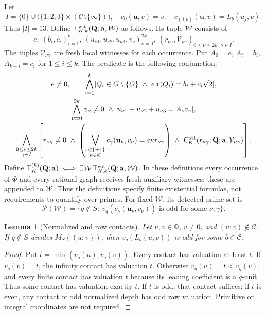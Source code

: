 \documentclass[11pt]{article}
\newtheorem{lemma}[theorem]{Lemma}
\theoremstyle{definition}\newtheorem{inputthm}[theorem]{Hypothesis}
\theoremstyle{remark}\newtheorem{remark}[theorem]{Remark}
\newcommand{\Q}{\mathbb Q}\newcommand{\Z}{\mathbb Z}
\newcommand{\C}{\mathcal C}\newcommand{\Supp}{\operatorname{Supp}}
\begin{document}
Let
\[
 I=\{0\}\cup\bigl(\{1,2,3\}\times(\C\setminus\{\infty\})\bigr),
 \quad
 c_0(\mathbf u,v)=v,
 \quad c_{(j,b)}(\mathbf u,v)=L_b(u_j,v).
\]
Thus $|I|=13$. Define $\mathsf T_{K,k}^{\rm wit}(\mathbf Q;\mathbf a,\mathcal W)$
as follows. Its tuple $\mathcal W$ consists of
\[
 e,\ (b_i,c_i)_{i=1}^k,
 \ (u_{\nu1},u_{\nu2},u_{\nu3},v_\nu)_{\nu=0}^{2k},
 \ (r_{\nu\gamma},\mathcal V_{\nu\gamma})_{
          0\le\nu\le2k,\ \gamma\in I}.
\]
The tuples $\mathcal V_{\nu\gamma}$ are fresh local witnesses for
each occurrence. Put $A_0=e$, $A_i=b_i$, $A_{k+i}=c_i$ for
$1\le i\le k$. The predicate is the following conjunction:
\begin{equation}\label{dir:T-wit}
\begin{gathered}
 e\ne0,\qquad
 \bigwedge_{i=1}^k[Q_i\in G\setminus\{O\}\ \land\
             e\,x(Q_i)=b_i+c_i\sqrt2],\\
 \bigwedge_{\nu=0}^{2k}
 [v_\nu\ne0\ \land\ u_{\nu1}+u_{\nu2}+u_{\nu3}=A_\nu v_\nu],\\
 \bigwedge_{\substack{0\le\nu\le2k\\\gamma\in I}}
 \left[
 r_{\nu\gamma}\ne0\ \land\
 \left(\bigvee_{\substack{\varepsilon\in\{\pm1\}\\\kappa\in\mathcal K}}
       c_\gamma(\mathbf u_\nu,v_\nu)=\varepsilon\kappa r_{\nu\gamma}
 \right)\ \land\
 \mathsf C_K^{\rm wit}(r_{\nu\gamma};\mathbf Q;\mathbf a,
                         \mathcal V_{\nu\gamma})
 \right].
\end{gathered}
\end{equation}
Define $\mathsf T_K^{(k)}(\mathbf Q;\mathbf a)\iff
\exists\mathcal W\,\mathsf T_{K,k}^{\rm wit}(\mathbf Q;\mathbf a,\mathcal W)$.
In these definitions every occurrence of $\Phi$ and every rational
graph receives fresh auxiliary witnesses; these are appended to
$\mathcal W$. Thus the definitions specify finite existential
formulas, not requirements to quantify over primes. For fixed
$\mathcal W$, its detected prime set is
\[
 \mathcal P(\mathcal W)=
 \{q\notin S:\ v_q(c_\gamma(\mathbf u_\nu,v_\nu))
                 \text{ is odd for some }\nu,\gamma\}.
\]

\begin{lemma}[Normalized and raw contacts]\label{dir:raw-contact}
Let $u,v\in\Q$, $v\ne0$, and $(u:v)\notin\C$.
If $q\notin S$ divides $M_{S}((u:v))$, then
$v_q(L_b(u,v))$ is odd for some $b\in\C$.
\end{lemma}
\begin{proof}
Put $t=\min(v_q(u),v_q(v))$. Every contact has valuation at least
$t$. If $v_q(v)=t$, the infinity contact has valuation $t$.
Otherwise $v_q(u)=t<v_q(v)$, and every finite contact has valuation
$t$ because its leading coefficient is a $q$-unit. Thus some
contact has valuation exactly $t$. If $t$ is odd, that contact
suffices; if $t$ is even, any contact of odd normalized depth has
odd raw valuation. Primitive or integral coordinates are not required.
\end{proof}
\end{document}
